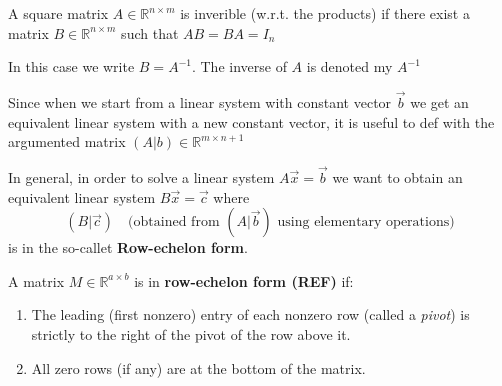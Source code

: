 \begin{definition}
    A square matrix $A \in \mathbb{R}^{n \times m}$ is inverible (w.r.t. the  products) if there exist a matrix $B \in \mathbb{R}^{n\times m}$ such that $AB = BA = I_n$

    In this case we write $B = A^{-1}$. The inverse of $A$ is denoted my $A^{-1}$ 
\end{definition}
Since when we start from a linear system with constant vector $\vec b$ we get an equivalent linear system with a new constant vector, it is useful to def with the argumented matrix $(A|b) \in \mathbb{R}^{m \times n+1}$

In general, in order to solve a linear system $A\vec x = \vec b$ we want to obtain an equivalent linear system $B \vec x = \vec c$ where 
$$(B| \vec c) \quad \text{(obtained from } (A| \vec b) \text{ using elementary operations)}$$
is in the so-callet \textbf{Row-echelon form}. 
\begin{definition}
    A matrix $M \in \mathbb{R}^{a \times b}$ is in \textbf{row-echelon form (REF)} if:
    \begin{enumerate}
        \item The leading (first nonzero) entry of each nonzero row (called a \emph{pivot}) is strictly to the right of the pivot of the row above it.
        \item All zero rows (if any) are at the bottom of the matrix.
    \end{enumerate}
\end{definition}


